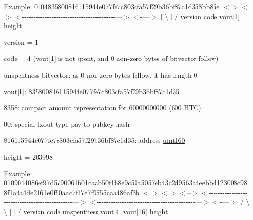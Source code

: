 Example\+: 0104835800816115944e077fe7c803cfa57f29b36bf87c1d358bb85e $<$$>$$<$$>$$<$-\/-\/-\/-\/-\/-\/-\/-\/-\/-\/-\/-\/-\/-\/-\/-\/-\/-\/-\/-\/-\/-\/-\/-\/-\/-\/-\/-\/-\/-\/-\/-\/-\/-\/-\/-\/-\/-\/-\/-\/-\/---$>$$<$-\/---$>$ $\vert$ \textbackslash{} $\vert$ / version code vout\mbox{[}1\mbox{]} height


\begin{DoxyItemize}
\item version = 1
\item code = 4 (vout\mbox{[}1\mbox{]} is not spent, and 0 non-\/zero bytes of bitvector follow)
\item unspentness bitvector\+: as 0 non-\/zero bytes follow, it has length 0
\item vout\mbox{[}1\mbox{]}\+: 835800816115944e077fe7c803cfa57f29b36bf87c1d35
\begin{DoxyItemize}
\item 8358\+: compact amount representation for 60000000000 (600 B\+TC)
\item 00\+: special txout type pay-\/to-\/pubkey-\/hash
\item 816115944e077fe7c803cfa57f29b36bf87c1d35\+: address \mbox{\hyperlink{classuint160}{uint160}}
\end{DoxyItemize}
\item height = 203998
\end{DoxyItemize}

Example\+: 0109044086ef97d5790061b01caab50f1b8e9c50a5057eb43c2d9563a4eebbd123008c988f1a4a4de2161e0f50aac7f17e7f9555caa486af3b $<$$>$$<$$>$$<$--$>$$<$-\/-\/-\/-\/-\/-\/-\/-\/-\/-\/-\/-\/-\/-\/-\/-\/-\/-\/-\/-\/-\/-\/-\/-\/-\/-\/-\/-\/-\/-\/-\/-\/-\/-\/-\/-\/-\/-\/-\/-\/-\/-\/-\/-\/-\/-\/-\/---$>$$<$-\/-\/-\/-\/-\/-\/-\/-\/-\/-\/-\/-\/-\/-\/-\/-\/-\/-\/-\/-\/-\/-\/-\/-\/-\/-\/-\/-\/-\/-\/-\/-\/-\/-\/-\/-\/-\/-\/-\/-\/-\/-\/-\/---$>$$<$-\/---$>$ / \textbackslash{} \textbackslash{} $\vert$ $\vert$ / version code unspentness vout\mbox{[}4\mbox{]} vout\mbox{[}16\mbox{]} height


